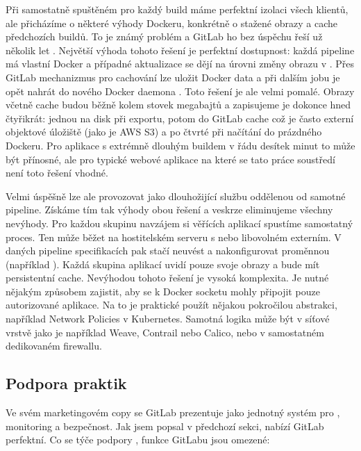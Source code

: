         Při samostatně spuštěném  pro každý build máme perfektní izolaci všech klientů, ale přicházíme o některé výhody Dockeru, konkrétně o stažené obrazy a cache předchozích buildů. To je známý problém a GitLab ho bez úspěchu řeší už několik let \cite{gitlab-docker-artifact-caching}. Největší výhoda tohoto řešení je perfektní dostupnost: každá pipeline má vlastní Docker a případné aktualizace se dějí na úrovni změny obrazu v . Přes GitLab mechanizmus pro cachování lze uložit Docker data a při dalším jobu je opět nahrát do nového Docker daemona \cite{patel-docker-cache}. Toto řešení je ale velmi pomalé. Obrazy včetně cache budou běžně kolem stovek megabajtů a zapisujeme je dokonce hned čtyřikrát: jednou na disk při exportu, potom do GitLab cache což je často externí objektové úložiště (jako je AWS S3) a po čtvrté při načítání do prázdného Dockeru. Pro aplikace s extrémně dlouhým buildem v řádu desítek minut to může být přínosné, ale pro typické webové aplikace na které se tato práce soustředí není toto řešení vhodné.

        Velmi úspěšně lze ale  provozovat jako dlouhožijící službu oddělenou od samotné \CI pipeline. Získáme tím tak výhody obou řešení a veskrze eliminujeme všechny nevýhody. Pro každou skupinu navzájem si věřících aplikací spustíme samostatný  proces. Ten může běžet na hostitelském serveru s \CI nebo libovolném externím. V daných pipeline specifikacích pak stačí neuvést  a nakonfigurovat proměnnou  (například ). Každá skupina aplikací uvidí pouze svoje obrazy a bude mít persistentní cache. Nevýhodou tohoto řešení je vysoká komplexita. Je nutné nějakým způsobem zajistit, aby se k Docker socketu mohly připojit pouze autorizované aplikace. Na to je praktické použít nějakou pokročilou abstrakci, například Network Policies v Kubernetes. Samotná  logika může být v síťové vrstvě jako je například Weave, Contrail nebo Calico, nebo v samostatném dedikovaném firewallu.

    \subsection{Podpora \CD praktik}
        Ve svém marketingovém copy se GitLab prezentuje jako jednotný systém pro \CICD, monitoring a bezpečnost. Jak jsem popsal v předchozí sekci, \CI nabízí GitLab perfektní. Co se týče podpory \CD, funkce GitLabu jsou omezené:

